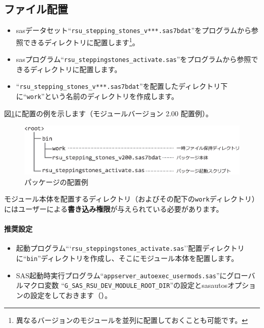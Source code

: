 \subsection{ファイル配置}
\begin{itemize}
	\item sasデータセット``\texttt{rsu\_stepping\_stones\_v***.sas7bdat}''をプログラムから参照できるディレクトリに配置します\footnote{異なるバージョンのモジュールを並列に配置しておくことも可能です。}。
	\item sasプログラム``\texttt{rsu\_steppingstones\_activate.sas}''をプログラムから参照できるディレクトリに配置します。
	\item ``\texttt{rsu\_stepping\_stones\_v***.sas7bdat}''を配置したディレクトリ下に``\texttt{work}''という名前のディレクトリを作成します。
\end{itemize}
図\ref{fig:DEPLOYMENT}に配置の例を示します（モジュールバージョン 2.00 配置例）。
\begin{figure}[!ht]
\begin{center}
\includegraphics[width=10truecm]{figs/fig_deployment.eps}
\end{center}
\caption{パッケージの配置例}\label{fig:DEPLOYMENT}
\end{figure}
\begin{marker}
モジュール本体を配置するディレクトリ（およびその配下の\texttt{work}ディレクトリ）にはユーザーによる{\bfseries 書き込み権限}が与えられている必要があります。
\end{marker}
\paragraph{推奨設定}
\begin{itemize}
	\item 起動プログラム```\texttt{rsu\_steppingstones\_activate.sas}''配置ディレクトリに``\texttt{bin}''ディレクトリを作成し、そこにモジュール本体を配置します。
	\item SAS起動時実行プログラム``\texttt{appserver\_autoexec\_usermods.sas}''にグローバルマクロ変数 ``\texttt{G\_SAS\_RSU\_DEV\_MODULE\_ROOT\_DIR}''の設定とsasautosオプションの設定をしておきます（）。
\end{itemize}
 
